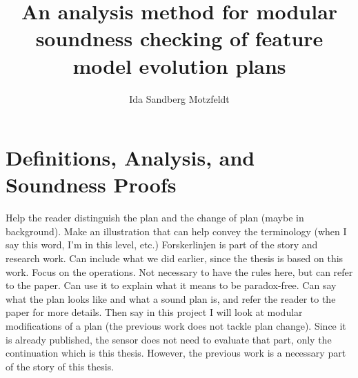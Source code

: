 \documentclass[a4paper,english]{ifimaster}
\title{An analysis method for modular soundness checking of feature model evolution plans}
\author{Ida Sandberg Motzfeldt}
\begin{document}
\duoforside[dept={Department of Informatics},
program={Informatics: Programming and System Architecture},
            option={Software},
long]

\frontmatter{}


\tableofcontents{}
\listoffigures{}

\mainmatter{}



\part{Definitions, Analysis, and Soundness Proofs}

Help the reader distinguish the plan and the change of plan (maybe in background). Make an illustration that can help convey the terminology (when I say this word, I'm in this level, etc.)
Forskerlinjen is part of the story and research work. Can include what we did earlier, since the thesis is based on this work. Focus on the operations. Not necessary to have the rules here, but can refer to the paper. Can use it to explain what it means to be paradox-free. Can say what the plan looks like and what a sound plan is, and refer the reader to the paper for more details. Then say in this project I will look at modular modifications of a plan (the previous work does not tackle plan change). Since it is already published, the sensor does not need to evaluate that part, only the continuation which is this thesis. However, the previous work is a necessary part of the story of this thesis.


 







\printbibliography



\backmatter{}
\end{document}
